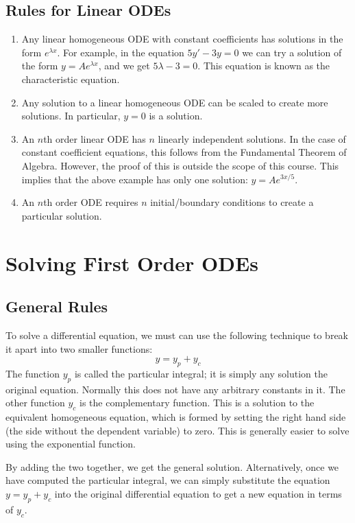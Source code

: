 \documentclass{article}
\begin{document}
	\subsection{Rules for Linear ODEs}
	\begin{enumerate}
		\item Any linear homogeneous ODE with constant coefficients has solutions in the form $e^{\lambda x}$. For example, in the equation $5y' - 3y = 0$ we can try a solution of the form $y = Ae^{\lambda x}$, and we get $5 \lambda - 3 = 0$. This equation is known as the characteristic equation.
		\item Any solution to a linear homogeneous ODE can be scaled to create more solutions. In particular, $y=0$ is a solution.
		\item An $n$th order linear ODE has $n$ linearly independent solutions. In the case of constant coefficient equations, this follows from the Fundamental Theorem of Algebra. However, the proof of this is outside the scope of this course. This implies that the above example has only one solution: $y = Ae^{3x/5}$.
		\item An $n$th order ODE requires $n$ initial/boundary conditions to create a particular solution.
	\end{enumerate}

	\section{Solving First Order ODEs}
	\subsection{General Rules}
	To solve a differential equation, we must can use the following technique to break it apart into two smaller functions:
	\[ y = y_p + y_c \]
	The function $y_p$ is called the particular integral; it is simply any solution 
	the original equation. Normally this does not have any arbitrary constants in it. The other function $y_c$ is the complementary function. This is a solution to the equivalent homogeneous equation, which is formed by setting the right hand side (the side without the dependent variable) to zero. This is generally easier to solve using the exponential function.
	
	By adding the two together, we get the general solution. Alternatively, once we have computed the particular integral, we can simply substitute the equation $y = y_p + y_c$ into the original differential equation to get a new equation in terms of $y_c$.
	
\end{document}
